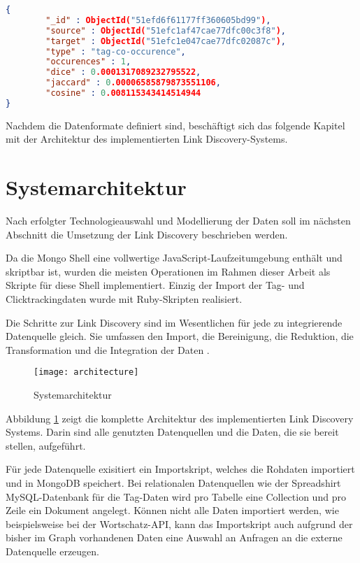 \begin{lstlisting}[language=json, label={lst:edge_json}, caption={Kantendokument in JSON}]
{
        "_id" : ObjectId("51efd6f61177ff360605bd99"),
        "source" : ObjectId("51efc1af47cae77dfc00c3f8"),
        "target" : ObjectId("51efc1e047cae77dfc02087c"),
        "type" : "tag-co-occurence",
        "occurences" : 1,
        "dice" : 0.0001317089232795522,
        "jaccard" : 0.00006585879873551106,
        "cosine" : 0.008115343414514944
}
\end{lstlisting}

Nachdem die Datenformate definiert sind, beschäftigt sich das folgende Kapitel mit der Architektur des implementierten Link Discovery-Systems.

\section{Systemarchitektur}

Nach erfolgter Technologieauswahl und Modellierung der Daten soll im nächsten Abschnitt die Umsetzung der Link Discovery beschrieben werden.

Da die Mongo Shell eine vollwertige JavaScript-Laufzeitumgebung enthält und skriptbar ist, wurden die meisten Operationen im Rahmen dieser Arbeit als Skripte für diese Shell implementiert. Einzig der Import der Tag- und Clicktrackingdaten wurde mit Ruby-Skripten realisiert.

Die Schritte zur Link Discovery sind im Wesentlichen für jede zu integrierende Datenquelle gleich. Sie umfassen den Import, die Bereinigung, die Reduktion, die Transformation und die Integration der Daten \cite{hkp2012}.

\begin{figure}
\centering
\texttt{[image: architecture]}
\caption{Systemarchitektur}
\label{fig:architecture}
\end{figure}

Abbildung \ref{fig:architecture} zeigt die komplette Architektur des implementierten Link Discovery Systems. Darin sind alle genutzten Datenquellen und die Daten, die sie bereit stellen, aufgeführt.

Für jede Datenquelle exisitiert ein Importskript, welches die Rohdaten importiert und in MongoDB speichert. Bei relationalen Datenquellen wie der Spreadshirt MySQL-Datenbank für die Tag-Daten wird pro Tabelle eine Collection und pro Zeile ein Dokument angelegt. Können nicht alle Daten importiert werden, wie beispielsweise bei der Wortschatz-API, kann das Importskript auch aufgrund der bisher im Graph vorhandenen Daten eine Auswahl an Anfragen an die externe Datenquelle erzeugen.

